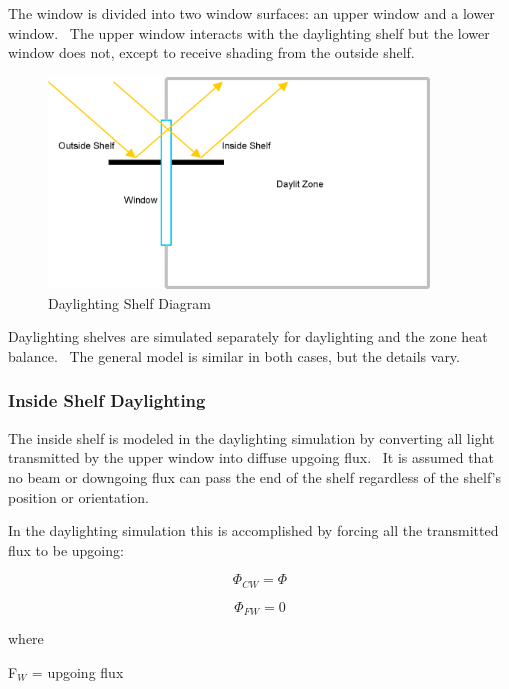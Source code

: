 The window is divided into two window surfaces: an upper window and a lower window.~ The upper window interacts with the daylighting shelf but the lower window does not, except to receive shading from the outside shelf.

\begin{figure}[hbtp] %
\centering
\includegraphics[width=0.9\textwidth, height=0.9\textheight, keepaspectratio=true]{media/image893.png}
\caption{  Daylighting Shelf Diagram \protect \label{fig:daylighting-shelf-diagram}}
\end{figure}

Daylighting shelves are simulated separately for daylighting and the zone heat balance.~ The general model is similar in both cases, but the details vary.

\subsubsection{Inside Shelf Daylighting}\label{inside-shelf-daylighting}

The inside shelf is modeled in the daylighting simulation by converting all light transmitted by the upper window into diffuse upgoing flux.~ It is assumed that no beam or downgoing flux can pass the end of the shelf regardless of the shelf's position or orientation.

In the daylighting simulation this is accomplished by forcing all the transmitted flux to be upgoing:

\begin{equation}
{\Phi_{CW}} = \Phi
\end{equation}

\begin{equation}
{\Phi_{FW}} = 0
\end{equation}

where

F\(_{W}\) = upgoing flux

